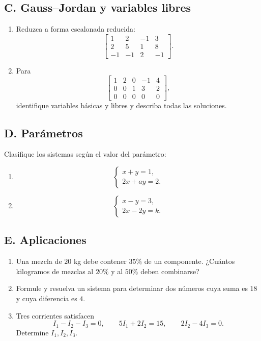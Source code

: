 \documentclass[12pt]{article}
\theoremstyle{remark}
\begin{document}
\subsection*{C. Gauss--Jordan y variables libres}
\begin{enumerate}
\item Reduzca a forma escalonada reducida:
\[
\left[
\begin{array}{ccc|c}
1&2&-1&3\\
2&5&1&8\\
-1&-1&2&-1
\end{array}
\right].
\]
\item Para
\[
\left[
\begin{array}{cccc|c}
1&2&0&-1&4\\
0&0&1&3&2\\
0&0&0&0&0
\end{array}
\right],
\]
identifique variables básicas y libres y describa todas las soluciones.
\end{enumerate}

\subsection*{D. Parámetros}
Clasifique los sistemas según el valor del parámetro:
\begin{enumerate}
\item
\[
\begin{cases}
x+y=1,\\
2x+ay=2.
\end{cases}
\]
\item
\[
\begin{cases}
x-y=3,\\
2x-2y=k.
\end{cases}
\]
\end{enumerate}

\subsection*{E. Aplicaciones}
\begin{enumerate}
\item Una mezcla de $20$ kg debe contener $35\%$ de un componente. ¿Cuántos kilogramos de mezclas
al $20\%$ y al $50\%$ deben combinarse?
\item Formule y resuelva un sistema para determinar dos números cuya suma es $18$ y cuya diferencia
es $4$.
\item Tres corrientes satisfacen
\[
I_1-I_2-I_3=0,\qquad 5I_1+2I_2=15,\qquad 2I_2-4I_3=0.
\]
Determine $I_1,I_2,I_3$.
\end{enumerate}
\end{document}
